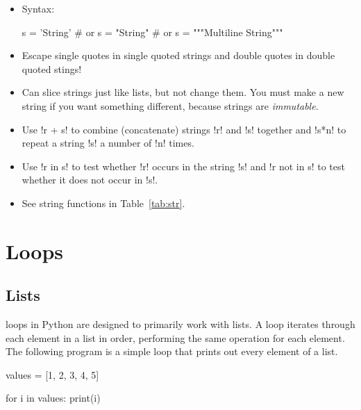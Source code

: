 \documentclass[11pt]{cselabheader}
\begin{document}
\begin{itemize}
  \item Syntax:

    \begin{python3code}
s = 'String'
# or
s = "String"
# or
s = """Multiline
String"""
    \end{python3code}

  \item Escape single quotes in single quoted strings and double quotes in
    double quoted stings!

  \item Can slice strings just like lists, but not change them. You must make a
    new string if you want something different, because strings are
    \emph{immutable}.

  \item Use \pythoninline!r + s! to combine (concatenate) strings \pythoninline!r! and
    \pythoninline!s! together and
    \pythoninline!s*n! to repeat a string \pythoninline!s! a number of \pythoninline!n!
    times.

  \item Use \pythoninline!r in s! to test whether \pythoninline!r! occurs in the
    string \pythoninline!s! and \pythoninline!r not in s! to test whether it does not
    occur in \pythoninline!s!.

  \item See string functions in Table~\ref{tab:str}.
\end{itemize}


\pagebreak
\section{\protect{} Loops}

\subsection{Lists}
 loops in Python are designed to primarily work with lists. A
 loop iterates through each element in a list in order,
performing the same operation for each element. The following program is a
simple  loop that prints out every element of a list.

\begin{python3code}
values = [1, 2, 3, 4, 5]

for i in values:
    print(i)
\end{python3code}
\end{document}
